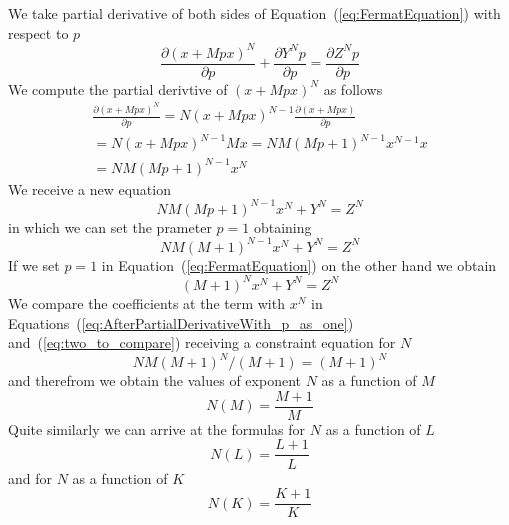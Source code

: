 \documentclass[SecEq,CM,GP]{degruyter-crelle} %
\theoremstyle{plain}
\theoremstyle{definition}
\begin{document}
We take partial derivative of both sides of Equation~(\ref{eq:FermatEquation}) with respect to $p$ 
\begin{equation}
\label{eq:FermatEquationTakingDerivative}
\frac{\partial (x + Mpx)^N}{\partial p} + \frac{\partial Y^N p}{\partial p} = \frac{\partial Z^N p}{\partial p}
\end{equation}
We compute the partial derivtive of $(x + Mpx)^N$ as follows
\begin{eqnarray}
\frac{\partial (x + Mpx)^N}{\partial p}
=
N(x + Mpx)^{N-1}  \frac{\partial (x + Mpx)}{\partial p}   \\ \nonumber
=
N(x + Mpx)^{N-1} Mx 
=
NM  (Mp+1)^{N-1} x^{N-1}  x     \\  \nonumber
=
NM  (Mp+1)^{N-1}  x^N
\end{eqnarray}
We receive a new equation
\begin{equation}
NM  (Mp+1)^{N-1}  x^N + Y^{N} = Z^{N}
\end{equation}
in which we can set the prameter $p=1$ obtaining
\begin{equation}
\label{eq:AfterPartialDerivativeWith_p_as_one}
NM  (M+1)^{N-1}  x^N + Y^{N} = Z^{N}
\end{equation}
If we set $p=1$ in Equation~(\ref{eq:FermatEquation}) on the other hand we obtain
\begin{equation}
\label{eq:two_to_compare}
(M+1)^{N} x^{N} + Y^N  = Z^N
\end{equation}
We compare the coefficients at the term with $x^{N}$ in Equations~(\ref{eq:AfterPartialDerivativeWith_p_as_one}) 
and~(\ref{eq:two_to_compare})
receiving a constraint equation for $N$
\begin{equation}
\label{eq:constraint_for_N}
NM(M+1)^{N}/(M+1) = (M+1)^{N}
\end{equation}
and therefrom we obtain the values of exponent $N$ as a function of $M$
\begin{equation}
  \label{eq:constraintNM}
  N(M) = \frac{M+1}{M}
\end{equation}
Quite similarly we can arrive at the formulas for $N$ as a function of $L$
\begin{equation}
  \label{eq:constraintNL}
  N(L) = \frac{L+1}{L}
\end{equation}
and for $N$ as a function of $K$
\begin{equation}
   \label{eq:constraintNK}
  N(K) = \frac{K+1}{K}
\end{equation}
\end{document}
